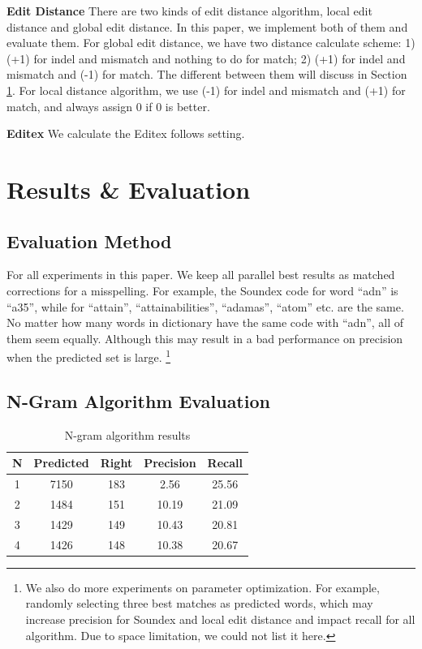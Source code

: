 \documentclass[11pt]{article}
\begin{document}
\noindent\textbf{Edit Distance} There are two kinds of edit distance algorithm, local edit distance and global edit distance. In this paper,  we implement both of them and evaluate them. For global edit distance, we have two distance calculate scheme: 1) (+1) for indel and mismatch and nothing to do for match; 2) (+1) for indel and mismatch and (-1) for match. The different between them will discuss in Section \ref{lab:res}. For local distance algorithm, we use (-1) for indel and mismatch and (+1) for match, and always assign 0 if 0 is better.

\noindent\textbf{Editex} We calculate the Editex follows  \cite{Zobel1996PhoneticSM} setting.
 
\section{Results \& Evaluation}\label{lab:res}

\subsection{Evaluation Method}

For all experiments in this paper. We keep all parallel best results as matched corrections for a misspelling. For example, the Soundex code for word ``adn'' is ``a35'', while for ``attain'', ``attainabilities'', ``adamas'', ``atom'' etc. are the same. No matter how many words in dictionary have the same code with ``adn'', all of them seem equally. Although this may result in a bad performance on precision when the predicted set is large. \footnote{We also do more experiments on parameter optimization. For example, randomly selecting three best matches as predicted words, which may increase precision for Soundex and local edit distance and impact recall for all algorithm. Due to space limitation, we could not list it here.}

\subsection{N-Gram Algorithm Evaluation}

\begin{table}
	\centering
	\small
	\begin{tabular}{c|c|c|c|c}
		\hline
		N &Predicted & Right & Precision & Recall \\
		\hline
		1 & 7150 & 183 & 2.56 & 25.56 \\
		\hline
		2 & 1484 & 151 & 10.19 & 21.09  \\
		\hline
		3 & 1429 & 149 & 10.43 & 20.81 \\
		\hline
		4 & 1426 & 148 & 10.38 & 20.67 \\
		\hline
	\end{tabular}
	\caption{N-gram algorithm results}
	\label{tab:ngram}
\end{table}
\end{document}
